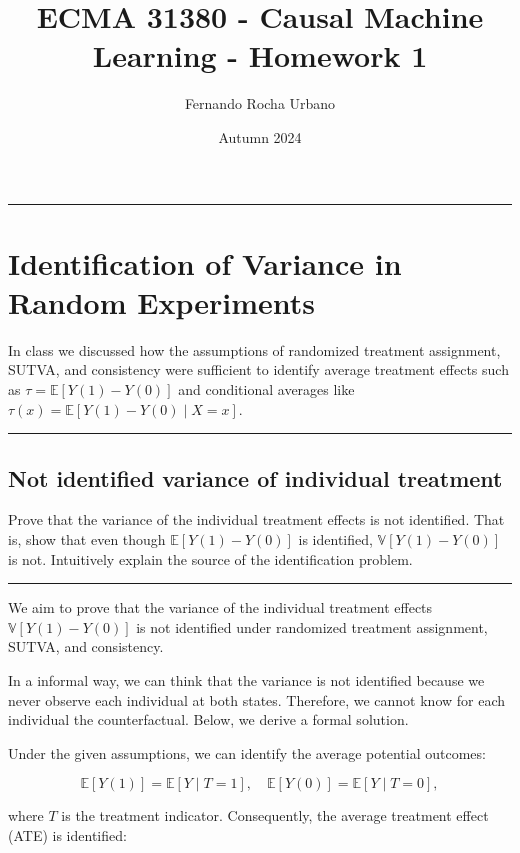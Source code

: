 \documentclass{article}
\title{ECMA 31380 - Causal Machine Learning - Homework 1}
\author{Fernando Rocha Urbano}
\date{Autumn 2024}
\newenvironment{colorparagraph}[1]{\par\color{#1}}{\par}
\begin{document}
\maketitle

\begin{colorparagraph}{questioncolor}
\rule{\textwidth}{0.5pt}

\label{q1}\section{Identification of Variance in Random Experiments}

In class we discussed how the assumptions of randomized treatment assignment, SUTVA, and consistency were sufficient to identify average treatment effects such as \(\tau = \mathbb{E}[Y(1) - Y(0)]\) and conditional averages like \(\tau(x) = \mathbb{E}[Y(1) - Y(0) \mid X = x]\).

\rule{\textwidth}{0.5pt}
\end{colorparagraph}

\begin{colorparagraph}{questioncolor}
\label{q1a}\subsection{Not identified variance of individual treatment} 
Prove that the variance of the individual treatment effects is not identified. That is, show that even though \(\mathbb{E}[Y(1) - Y(0)]\) is identified, \(\mathbb{V}[Y(1) - Y(0)]\) is not. Intuitively explain the source of the identification problem.

\rule{\textwidth}{0.5pt}
\end{colorparagraph}

We aim to prove that the variance of the individual treatment effects \(\mathbb{V}[Y(1) - Y(0)]\) is not identified under randomized treatment assignment, SUTVA, and consistency.

In a informal way, we can think that the variance is not identified because we never observe each individual at both states. Therefore, we cannot know for each individual the counterfactual. Below, we derive a formal solution.

Under the given assumptions, we can identify the average potential outcomes:

\[
\mathbb{E}[Y(1)] = \mathbb{E}[Y \mid T = 1], \quad \mathbb{E}[Y(0)] = \mathbb{E}[Y \mid T = 0],
\]

where \(T\) is the treatment indicator. Consequently, the average treatment effect (ATE) is identified:
\end{document}

